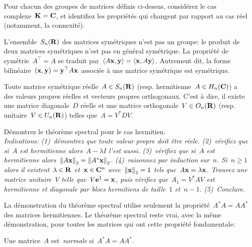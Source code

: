 \begin{exercice}
	Pour chacun des groupes de matrices définis ci-dessus, considérez
	le cas complexe~$\mathbf{K}=\mathbf{C}$, et identifiez les propriétés qui changent par
	rapport au cas réel (notamment, la connexité).
\end{exercice}

L'ensemble~$S_n(\mathbf{R})$ des matrices symétriques n'est pas un groupe: le produit
de deux matrices symétriques n'est pas en général symétrique.  La propriété
de symétrie~$A^\top=A$ se traduit par~$\left\langle A\mathbf{x},\mathbf{y}\right\rangle=\left\langle \mathbf{x},A\mathbf{y}\right\rangle$.
Autrement dit, la forme bilinéaire~$(\mathbf{x},\mathbf{y})=\mathbf{y}^\top A\mathbf{x}$
associée à une matrice symétrique est symétrique.

\begin{proposition}
	Toute matrice symétrique réelle~$A\in S_n(\mathbf{R})$ (resp. hermitienne~$A\in
	H_n(\mathbf{C})$) a des valeurs propres réelles et vecteurs propres orthogonaux.
	C'est à dire, il existe une matrice diagonale~$D$ réelle et une matrice
	orthogonale~$V\in O_n(\mathbf{R})$ (resp.  unitaire~$V\in U_n(\mathbf{R})$) telles
	que~$A=V^* D V$.
\end{proposition}

\begin{exercice}
	Démontrez le théorème spectral pour le cas hermitien.\\
	\emph{
	Indications: (1)~démontrez que toute valeur propre doit être réele.
	(2)\!~vérifiez que si~$A$ est hermitienne alors~$A-\lambda I$ l'est aussi.
	(3)\!~vérifiez que si~$A$ est hermitienne
	alors~$\left\|A\mathbf{x}\right\|_2=\left\|A^*\mathbf{x}\right\|_2$.
	(4)\!~raisonnez par induction sur~$n$.  Si~$n\ge 1$ alors il
	existent~$\lambda\in\mathbf{R}$ et~$\mathbf{x}\in\mathbf{C}^n$ avec~$\left\|\mathbf{x}\right\|_2=1$ tels
	que~$A\mathbf{x}=\lambda\mathbf{x}$.  Trouvez une matrice unitaire~$V$ telle
	que~$V\mathbf{e}^1=\mathbf{x}$, puis vérifiez que~$A_1=V^*AV$ est hermitienne et diagonale
	par blocs hermitiens de taille~$1$ et~$n-1$.
	(5)\!\!~Conclure.
}
\end{exercice}

La démonstration du théorème spectral utilise seulement la
propriété~$A^*A=AA^*$ des matrices hermitiennes.  Le théorème spectral reste
vrai, avec la même démonstration, pour toutes les matrices qui ont cette
propriété fondamentale:

\begin{definition}
	Une matrice~$A$ est~\emph{normale} si~$A^*A=AA^*$.
\end{definition}


